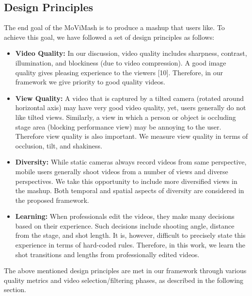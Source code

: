 \documentclass{sig-alternate-05-2015}
\begin{document}
\subsection{Design Principles}
The end goal of the MoViMash is to produce a mashup that users
like. To achieve this goal, we have followed a set of design principles as follows:
\begin{itemize}
    \item \textbf{Video Quality:} In our discussion, video quality includes
sharpness, contrast, illumination, and blockiness (due to video
compression). A good image quality gives pleasing experience to the viewers [10]. Therefore, in our framework we
give priority to good quality videos.
\end{itemize}
\begin{itemize}
    \item \textbf{View Quality:} A video that is captured by a tilted camera
(rotated around horizontal axis) may have very good video
quality, yet, users generally do not like tilted views. Similarly, a view in which a person or object is occluding stage
area (blocking performance view) may be annoying to the user. Therefore view quality is also important. We measure
view quality in terms of occlusion, tilt, and shakiness.
\end{itemize}
\begin{itemize}
    \item \textbf{Diversity:} While static cameras always record videos from
same perspective, mobile users generally shoot videos from
a number of views and diverse perspectives. We take this
opportunity to include more diversified views in the mashup.
Both temporal and spatial aspects of diversity are considered
in the proposed framework.
\end{itemize}
\begin{itemize}
    \item \textbf{Learning:} When professionals edit the videos, they make
many decisions based on their experience. Such decisions
include shooting angle, distance from the stage, and shot
length. It is, however, difficult to precisely state this experience in terms of hard-coded rules. Therefore, in this work,
we learn the shot transitions and lengths from professionally
edited videos.
\end{itemize}\par
The above mentioned design principles are met in our framework
through various quality metrics and video selection/filtering phases,
as described in the following section.
\end{document}
